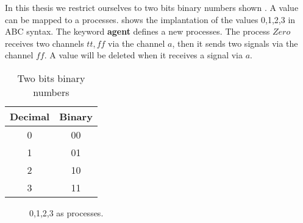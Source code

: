 In this thesis we restrict ourselves to two bits binary numbers shown . A value can be mapped to a \picalc{} processes.  shows the \picalc{} implantation of the values 0,1,2,3 in ABC syntax. The keyword \textbf{agent} defines a new processes. The process $Zero$ receives two channels $tt,ff$ via the channel $a$, then it sends two signals via the channel $ff$. A value will be deleted when it receives a signal via $a$.
\begin{table}[H]
\centering
\begin{tabular}{|c|c|}
\hline
Decimal & Binary \\ \hline
0       & 00     \\ \hline
1       & 01     \\ \hline
2       & 10     \\ \hline
3       & 11     \\ \hline
\end{tabular}%
\caption{Two bits binary numbers}
\label{two_bit_binary_numbers}
\end{table}
\begin{figure}[ht!]

\caption{0,1,2,3 as \picalc{} processes.}
\label{values_ABC_code}
\end{figure}